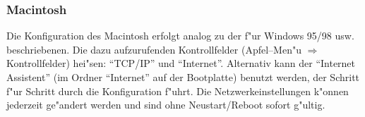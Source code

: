 

\subsubsection{Macintosh}
Die Konfiguration des Macintosh erfolgt analog zu der f"ur Windows 95/98
usw. beschriebenen. Die dazu aufzurufenden Kontrollfelder (Apfel--Men"u
$\Rightarrow$ Kontrollfelder) hei"sen:
"`TCP/IP"' und "`Internet"'. Alternativ kann der "`Internet Assistent"' (im
Ordner "`Internet"' auf der Bootplatte) benutzt werden, der Schritt f"ur
Schritt durch die Konfiguration f"uhrt. Die Netzwerkeinstellungen k"onnen
jederzeit ge"andert werden und sind ohne Neustart/Reboot sofort
g"ultig.
